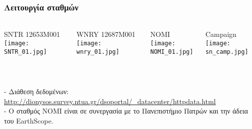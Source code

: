 \note{}

\begin{frame}
  \frametitle{Λειτουργία σταθμών}
  \framesubtitle{}
  \label{}
  \vskip-1cm
  \begin{columns}[T]
    \begin{column}{.25\textwidth}
      \begin{center}
      {\scriptsize SNTR 12653M001}
        \texttt{[image: SNTR\_01.jpg]}
      \end{center}  
    \end{column}
    \begin{column}{.25\textwidth}
      \begin{center}
       {\scriptsize WNRY 12687M001}
        \texttt{[image: wnry\_01.jpg]}
      \end{center}       
    \end{column}
  \begin{column}{.25\textwidth}
      \begin{center}
       {\scriptsize NOMI}
        \texttt{[image: NOMI\_01.jpg]}
      \end{center}  
    \end{column}
    \begin{column}{.25\textwidth}
      \begin{center}
       {\scriptsize Campaign}
        \texttt{[image: sn\_camp.jpg]}
      \end{center}       
    \end{column}
  \end{columns}  
  ~\\[1em]
\begin{scriptsize}
- Διάθεση δεδομένων: \url{http://dionysos.survey.ntua.gr/dsoportal/\_datacenter/httpdata.html}\\
- Ο σταθμός ΝΟΜΙ είναι σε συνεργασία με το Πανεπιστήμιο Πατρών και την άδεια του EarthScope.
\end{scriptsize}

\end{frame}
\note{}

